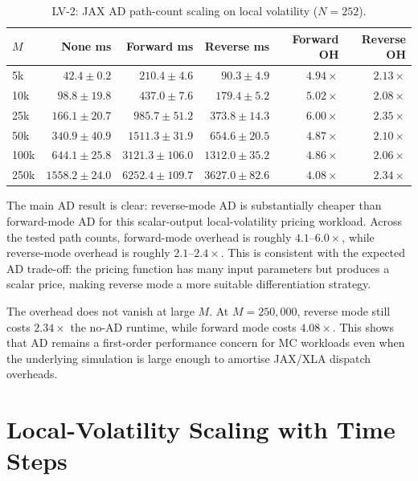 \begin{table}[htbp]
\centering
\small
\caption{LV-2: JAX AD path-count scaling on local volatility (\(N=252\)).}
\label{tab:lv2-ad-m-scaling}
\begin{tabular}{lrrrrr}
\toprule
\textbf{\(M\)}
& \textbf{None ms}
& \textbf{Forward ms}
& \textbf{Reverse ms}
& \textbf{Forward OH}
& \textbf{Reverse OH} \\
\midrule
5k
& \(42.4\pm0.2\)
& \(210.4\pm 4.6\)
& \(90.3\pm 4.9\)
& \(4.94\times\)
& \(2.13\times\) \\
10k
& \(98.8\pm19.8\)
& \(437.0\pm 7.6\)
& \(179.4\pm 5.2\)
& \(5.02\times\)
& \(2.08\times\) \\
25k
& \(166.1\pm20.7\)
& \(985.7\pm51.2\)
& \(373.8\pm14.3\)
& \(6.00\times\)
& \(2.35\times\) \\
50k
& \(340.9\pm40.9\)
& \(1511.3\pm31.9\)
& \(654.6\pm20.5\)
& \(4.87\times\)
& \(2.10\times\) \\
100k
& \(644.1\pm25.8\)
& \(3121.3\pm106.0\)
& \(1312.0\pm35.2\)
& \(4.86\times\)
& \(2.06\times\) \\
250k
& \(1558.2\pm24.0\)
& \(6252.4\pm109.7\)
& \(3627.0\pm82.6\)
& \(4.08\times\)
& \(2.34\times\) \\
\bottomrule
\end{tabular}
\end{table}

The main AD result is clear: reverse-mode AD is substantially cheaper than
forward-mode AD for this scalar-output local-volatility pricing workload.
Across the tested path counts, forward-mode overhead is roughly
\(4.1\)--\(6.0\times\), while reverse-mode overhead is roughly
\(2.1\)--\(2.4\times\).  This is consistent with the expected AD trade-off:
the pricing function has many input parameters but produces a scalar price,
making reverse mode a more suitable differentiation strategy.

The overhead does not vanish at large \(M\).  At \(M=250{,}000\), reverse
mode still costs \(2.34\times\) the no-AD runtime, while forward mode costs
\(4.08\times\).  This shows that AD remains a first-order performance
concern for MC workloads even when the underlying simulation is large enough
to amortise JAX/XLA dispatch overheads.

\section{Local-Volatility Scaling with Time Steps}
\label{sec:results-lv3}

